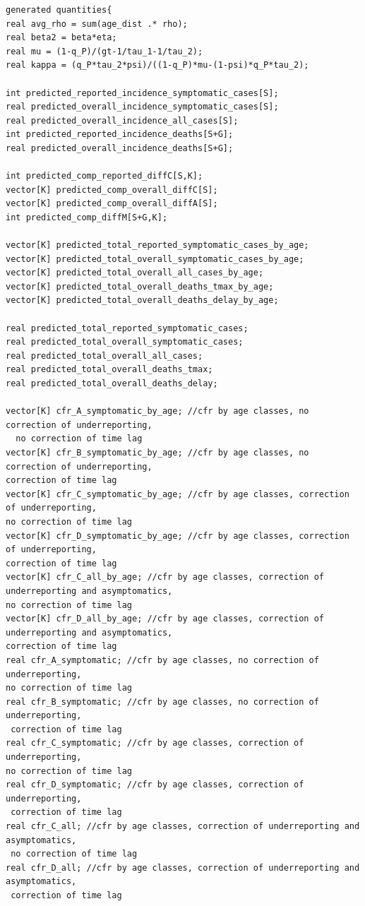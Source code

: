 \documentclass{article}
\begin{document}
\begin{verbatim}
generated quantities{
real avg_rho = sum(age_dist .* rho);
real beta2 = beta*eta;
real mu = (1-q_P)/(gt-1/tau_1-1/tau_2);
real kappa = (q_P*tau_2*psi)/((1-q_P)*mu-(1-psi)*q_P*tau_2);

int predicted_reported_incidence_symptomatic_cases[S]; 
real predicted_overall_incidence_symptomatic_cases[S]; 
real predicted_overall_incidence_all_cases[S]; 
int predicted_reported_incidence_deaths[S+G];
real predicted_overall_incidence_deaths[S+G];

int predicted_comp_reported_diffC[S,K];
vector[K] predicted_comp_overall_diffC[S];
vector[K] predicted_comp_overall_diffA[S];
int predicted_comp_diffM[S+G,K];

vector[K] predicted_total_reported_symptomatic_cases_by_age;
vector[K] predicted_total_overall_symptomatic_cases_by_age;
vector[K] predicted_total_overall_all_cases_by_age;
vector[K] predicted_total_overall_deaths_tmax_by_age;
vector[K] predicted_total_overall_deaths_delay_by_age;

real predicted_total_reported_symptomatic_cases;
real predicted_total_overall_symptomatic_cases;
real predicted_total_overall_all_cases;
real predicted_total_overall_deaths_tmax;
real predicted_total_overall_deaths_delay;

vector[K] cfr_A_symptomatic_by_age; //cfr by age classes, no correction of underreporting, 
  no correction of time lag
vector[K] cfr_B_symptomatic_by_age; //cfr by age classes, no correction of underreporting, 
correction of time lag
vector[K] cfr_C_symptomatic_by_age; //cfr by age classes, correction of underreporting, 
no correction of time lag
vector[K] cfr_D_symptomatic_by_age; //cfr by age classes, correction of underreporting, 
correction of time lag
vector[K] cfr_C_all_by_age; //cfr by age classes, correction of underreporting and asymptomatics, 
no correction of time lag
vector[K] cfr_D_all_by_age; //cfr by age classes, correction of underreporting and asymptomatics, 
correction of time lag
real cfr_A_symptomatic; //cfr by age classes, no correction of underreporting, 
no correction of time lag
real cfr_B_symptomatic; //cfr by age classes, no correction of underreporting,
 correction of time lag
real cfr_C_symptomatic; //cfr by age classes, correction of underreporting, 
no correction of time lag
real cfr_D_symptomatic; //cfr by age classes, correction of underreporting,
 correction of time lag
real cfr_C_all; //cfr by age classes, correction of underreporting and asymptomatics,
 no correction of time lag
real cfr_D_all; //cfr by age classes, correction of underreporting and asymptomatics,
 correction of time lag


\end{verbatim}
\end{document}
